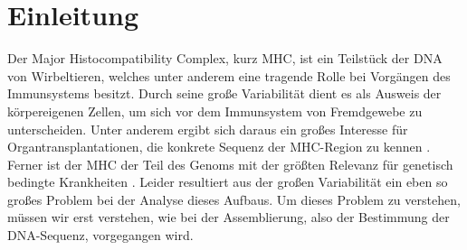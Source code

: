 \section{Einleitung} \raggedbottom 
Der Major Histocompatibility Complex, kurz MHC, ist ein Teilstück der DNA von Wirbeltieren, welches unter anderem eine tragende Rolle bei Vorgängen des Immunsystems besitzt. Durch seine große Variabilität dient es als Ausweis der körpereigenen Zellen, um sich vor dem Immunsystem von Fremdgewebe zu unterscheiden. Unter anderem ergibt sich daraus ein großes Interesse für Organtransplantationen, die konkrete Sequenz der MHC-Region zu kennen \cite{Opelz1999HLACA}. Ferner ist der MHC der Teil des Genoms mit der größten Relevanz für genetisch bedingte Krankheiten \cite{tiwari2012hla}. 
Leider resultiert aus der großen Variabilität ein eben so großes Problem bei der Analyse dieses Aufbaus. Um dieses Problem zu verstehen, müssen wir erst verstehen, wie bei der Assemblierung, also der Bestimmung der DNA-Sequenz, vorgegangen wird.\\

